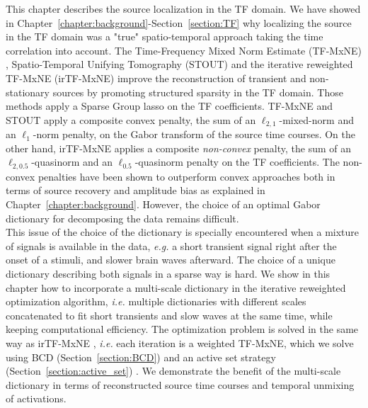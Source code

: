 This chapter describes the source localization in the \ac{TF} domain. We have showed in Chapter~\ref{chapter:background}-Section~\ref{section:TF} why localizing the source in the \ac{TF} domain was a "true" spatio-temporal approach taking the time correlation into account.
The Time-Frequency Mixed Norm Estimate (TF-MxNE) \cite{Alex13}, Spatio-Temporal Unifying Tomography (STOUT) \cite{castano2015solving} and the iterative reweighted TF-MxNE (irTF-MxNE) \cite{daniel15} improve the reconstruction of transient and non-stationary sources by promoting structured sparsity in the TF domain. Those methods apply a Sparse Group \ac{lasso} on the TF coefficients. TF-MxNE and STOUT apply a composite convex penalty, the sum of an $\ell_{2, 1}$-mixed-norm and an $\ell_{1}$-norm penalty, on the Gabor transform of the source time courses. On the other hand, irTF-MxNE applies a composite \emph{non-convex} penalty, the sum of an $\ell_{2, 0.5}$-quasinorm and an $\ell_{0.5}$-quasinorm penalty on the TF coefficients.
The non-convex penalties have been shown to outperform convex approaches both in terms of source recovery and amplitude bias \cite{candes2008enhancing,daubechies2010iteratively} as explained in Chapter~\ref{chapter:background}. However, the choice of an optimal Gabor dictionary for decomposing the data remains difficult.\\

This issue of the choice of the dictionary is specially encountered when a mixture of signals is available in the data, \textit{e.g.} a short transient signal right after the onset of a stimuli, and slower brain waves afterward. The choice of a unique dictionary describing both signals in a sparse way is hard. We show in this chapter how to incorporate a multi-scale dictionary in the iterative reweighted optimization algorithm, \textit{i.e.} multiple dictionaries with different scales concatenated to fit short transients and slow waves at the same time, while keeping computational efficiency. The optimization problem is solved in the same way as irTF-MxNE \cite{daniel15}, \textit{i.e.} each iteration is a weighted TF-MxNE, which we solve using \ac{BCD} (Section~\ref{section:BCD}) and an active set strategy (Section~\ref{section:active_set}) \cite{friedman2010regularization}. %
We demonstrate the benefit of the multi-scale dictionary in terms of reconstructed source time courses and temporal unmixing of activations.

